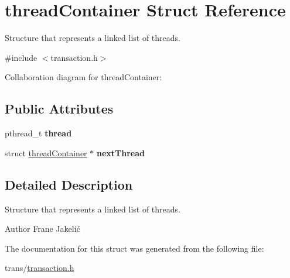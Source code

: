\hypertarget{structthreadContainer}{\section{thread\+Container Struct Reference}
\label{structthreadContainer}
}


Structure that represents a linked list of threads.  




{\ttfamily \#include $<$transaction.\+h$>$}



Collaboration diagram for thread\+Container\+:
\subsection*{Public Attributes}
\begin{DoxyCompactItemize}
\item 
\hypertarget{structthreadContainer_aec4a9c751d5d1202bafdfbb769c4a3b0}{pthread\+\_\+t {\bfseries thread}}\label{structthreadContainer_aec4a9c751d5d1202bafdfbb769c4a3b0}

\item 
\hypertarget{structthreadContainer_a07e020d387df3d860a0cee5d5e8d4237}{struct \hyperlink{structthreadContainer}{thread\+Container} $\ast$ {\bfseries next\+Thread}}\label{structthreadContainer_a07e020d387df3d860a0cee5d5e8d4237}

\end{DoxyCompactItemize}


\subsection{Detailed Description}
Structure that represents a linked list of threads. 

\begin{DoxyAuthor}{Author}
Frane Jakelić 
\end{DoxyAuthor}


The documentation for this struct was generated from the following file\+:\begin{DoxyCompactItemize}
\item 
trans/\hyperlink{transaction_8h}{transaction.\+h}\end{DoxyCompactItemize}
